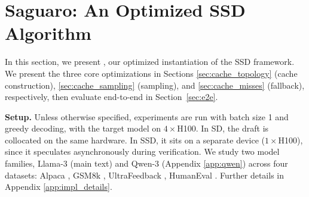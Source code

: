 \section{Saguaro: An Optimized SSD Algorithm}
\label{sec:method}

In this section, we present \Sys, our optimized instantiation of the SSD framework.
We present the three core optimizations in Sections \ref{sec:cache_topology} (\Sys cache construction), \ref{sec:cache_sampling} (\Sys sampling), and \ref{sec:cache_misses} (\Sys fallback), respectively, then evaluate \Sys end-to-end in Section~\ref{sec:e2e}. 

\textbf{Setup.} Unless otherwise specified, experiments are run with batch size 1 and greedy decoding, with the target model on $4\times$H100. In SD, the draft is collocated on the same hardware.
In SSD, it sits on a separate device ($1\times$H100), since it speculates asynchronously during verification.
We study two model families, Llama-3 (main text) and Qwen-3 (Appendix \ref{app:qwen}) across four datasets: Alpaca \citep{dubois2024alpacafarmsimulationframeworkmethods}, GSM8k \citep{cobbe2021trainingverifierssolvemath}, UltraFeedback \citep{cui2024ultrafeedbackboostinglanguagemodels}, HumanEval \citep{chen2021evaluatinglargelanguagemodels}. Further details in Appendix \ref{app:impl_details}. 
\color{black}






